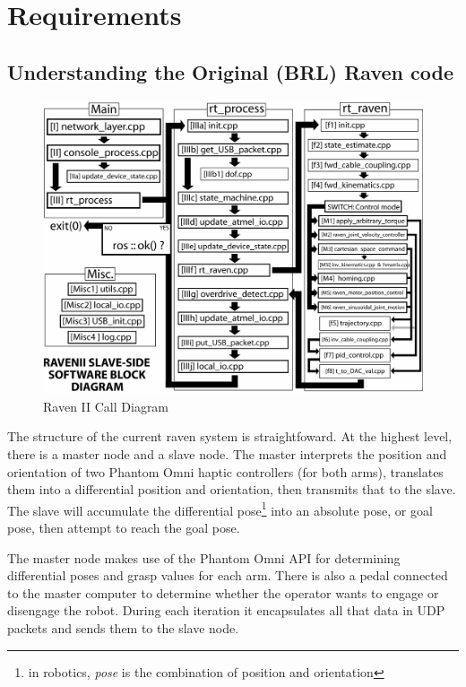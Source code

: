 \documentclass[letterpaper,twocolumn,10pt]{article}
\begin{document}
\section{Requirements}

\subsection{Understanding the Original (BRL) Raven code}

\begin{figure}[h]
  \includegraphics[scale=0.33]{RavenII_Block_Diagram.jpg}
  \caption{Raven II Call Diagram}
  \label{fig:block_diagram}
\end{figure}

The structure of the current raven system is straightfoward. At the
highest level, there is a master node and a slave node. The master
interprets the position and orientation of two Phantom Omni haptic
controllers (for both arms), translates them into a differential
position and orientation, then transmits that to the slave. The slave
will accumulate the differential pose\footnote{in robotics, \emph{pose}
  is the combination of position and orientation} into an absolute
pose, or goal pose, then attempt to reach the goal pose.

The master node makes use of the Phantom Omni API for determining
differential poses and grasp values for each arm. There is also a
pedal connected to the master computer to determine whether the
operator wants to engage or disengage the robot. During each iteration
it encapsulates all that data in UDP packets and sends them to the
slave node.
\end{document}
